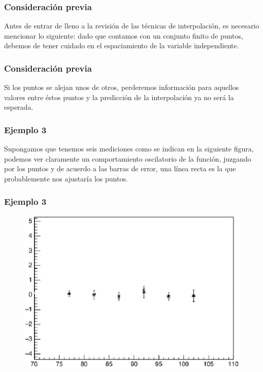 \documentclass[12pt]{beamer}
\begin{document}
\begin{frame}
\frametitle{Consideración previa}
Antes de entrar de lleno a la revisión de las técnicas de interpolación, es necesario mencionar lo siguiente: dado que contamos con un conjunto finito de puntos, debemos de tener cuidado en el espaciamiento de la variable independiente.
\end{frame}
\begin{frame}
\frametitle{Consideración previa}
Si los puntos se alejan unos de otros, perderemos información para aquellos valores entre éstos puntos y la predicción de la interpolación ya no será la esperada.
\end{frame}
\begin{frame}
\frametitle{Ejemplo 3}
Supongamos que tenemos seis mediciones como se indican en la siguiente figura, podemos ver claramente un comportamiento oscilatorio de la función, juzgando por los puntos y de acuerdo a las barras de error, una línea recta es la que probablemente nos ajustaría los puntos.
\end{frame}
\begin{frame}
\frametitle{Ejemplo 3}
\begin{figure}
	\centering
	\includegraphics[scale=0.6]{Imagenes/figura01-1.eps} 
\end{figure}
\end{frame}
\end{document}

